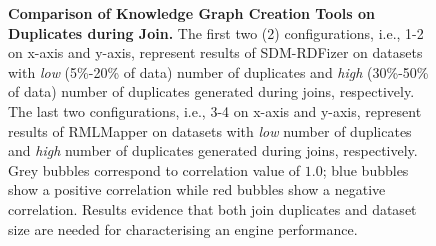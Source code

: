 \begin{figure}[!tb]
    \caption{\textbf{Comparison of Knowledge Graph Creation Tools on Duplicates during Join.} The first two (2) configurations, i.e., 1-2 on x-axis and y-axis, represent results of SDM-RDFizer on datasets with \textit{low} (5\%-20\% of data) number of duplicates and \textit{high} (30\%-50\% of data) number of duplicates generated during joins, respectively. The last two configurations, i.e., 3-4 on x-axis and y-axis, represent results of RMLMapper on datasets with \textit{low} number of duplicates and \textit{high} number of duplicates generated during joins, respectively. Grey bubbles correspond to correlation value of $1.0$; blue bubbles show a positive correlation while red bubbles show a negative correlation. Results evidence that both join duplicates and dataset size are needed for characterising an engine performance.}
    \label{fig:duplicates_bubble}
\end{figure}


